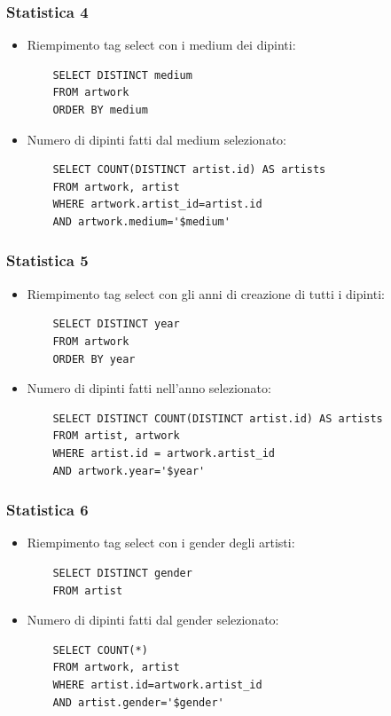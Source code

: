 \documentclass{ol-softwaremanual}
\begin{document}
\subsubsection{Statistica 4}
\begin{itemize}
    \item Riempimento tag select con i medium dei dipinti:
    \begin{verbatim}
    SELECT DISTINCT medium 
    FROM artwork
    ORDER BY medium
    \end{verbatim}
    \item Numero di dipinti fatti dal medium selezionato:
    \begin{verbatim}
    SELECT COUNT(DISTINCT artist.id) AS artists
    FROM artwork, artist
    WHERE artwork.artist_id=artist.id
    AND artwork.medium='$medium'
    \end{verbatim}
\end{itemize}
\subsubsection{Statistica 5}
\begin{itemize}
    \item Riempimento tag select con gli anni di creazione di tutti i dipinti:
    \begin{verbatim}
    SELECT DISTINCT year
    FROM artwork
    ORDER BY year
    \end{verbatim}
    \item Numero di dipinti fatti nell'anno selezionato:
    \begin{verbatim}
    SELECT DISTINCT COUNT(DISTINCT artist.id) AS artists 
    FROM artist, artwork 
    WHERE artist.id = artwork.artist_id 
    AND artwork.year='$year'
    \end{verbatim}
\end{itemize}
\subsubsection{Statistica 6}
\begin{itemize}
    \item Riempimento tag select con i gender degli artisti:
    \begin{verbatim}
    SELECT DISTINCT gender
    FROM artist
    \end{verbatim}
    \newpage
    \item Numero di dipinti fatti dal gender selezionato:
    \begin{verbatim}
    SELECT COUNT(*)
    FROM artwork, artist
    WHERE artist.id=artwork.artist_id
    AND artist.gender='$gender'
    \end{verbatim}
\end{itemize}
\end{document}

